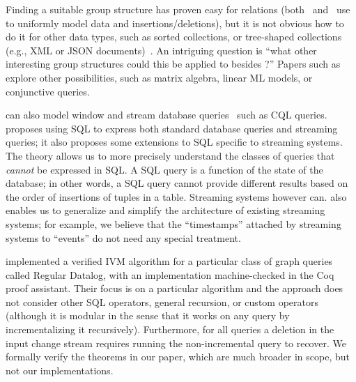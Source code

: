 Finding a suitable group structure has proven easy for relations
(both~\cite{koch-pods10} and~\cite{green-tcs11} use \zrs to uniformly
model data and insertions/deletions), but it is not obvious how to do
it for other data types, such as sorted collections, or tree-shaped
collections (e.g., XML or JSON documents)~\cite{foster-planx08}.  An
intriguing question is ``what other interesting group structures could
this be applied to besides \zrs?''  Papers such
as~\cite{nikolic-icmd18} explore other possibilities, such as matrix
algebra, linear ML models, or conjunctive queries.

\dbsp can also model window and stream database
queries~\cite{arasu-tr02,aurora} such as CQL queries.
\cite{begoli-sigmod19} proposes using SQL to express both standard
database queries and streaming queries; it also proposes some
extensions to SQL specific to streaming systems.  The \dbsp theory
allows us to more precisely understand the classes of queries that
\emph{cannot} be expressed in SQL.  A SQL query is a function of the
state of the database; in other words, a SQL query cannot provide
different results based on the order of insertions of tuples in a
table.  Streaming systems however can.  \dbsp also enables us to
generalize and simplify the architecture of existing streaming
systems; for example, we believe that the ``timestamps'' attached by
streaming systems to ``events'' do not need any special treatment.

\cite{bonifati-iclp2018} implemented a verified IVM algorithm for a
particular class of graph queries called Regular Datalog, with an
implementation machine-checked in the Coq proof assistant. Their focus
is on a particular algorithm and the approach does not consider other
SQL operators, general recursion, or custom operators (although it is
modular in the sense that it works on any query by incrementalizing it
recursively). Furthermore, for all queries a deletion in the input
change stream requires running the non-incremental query to recover.
We formally verify the theorems in our paper, which are much broader
in scope, but not our implementations.


